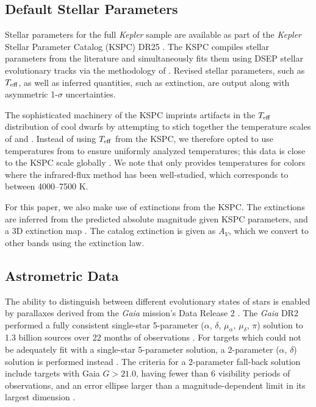 \documentclass[manuscript]{aastex6}
\newcommand{\Kepler}{\mbox{\textit{Kepler}}}
\newcommand{\Gaia}{\mbox{\textit{Gaia}}}
\newcommand{\Teff}{\ensuremath{T_{\rm eff}}}
\begin{document}
\subsection{Default Stellar Parameters}

Stellar parameters for the full \Kepler{} sample are available as part of the
\Kepler{} Stellar Parameter Catalog (KSPC) DR25 \citep{Mathur17}. The KSPC
compiles stellar parameters from the literature and simultaneously fits them
using DSEP stellar evolutionary tracks \citep{Dotter08} via the methodology of
\citet{Huber14}. Revised stellar parameters, such as \Teff, as well as inferred
quantities, such as extinction, are output along with asymmetric
1-\(\sigma\) uncertainties. 

The sophisticated machinery of the KSPC imprints artifacts in the \Teff{}
distribution of cool dwarfs by attempting to stich together the temperature
scales of \citet{Pinsonneault12} and \citet{Dressing13}. Instead of using
\Teff{} from the KSPC, we therefore opted to use temperatures from 
\citet{Pinsonneault12} to ensure uniformly analyzed temperatures; this data is
close to the KSPC scale globally \citep{Huber17}. We note that 
\citet{Pinsonneault12} only provides temperatures for colors where the
infrared-flux method has been well-studied, which corresponds to between
4000--7500 K.

For this paper, we also make use of extinctions from the KSPC\@. The
extinctions are inferred from the predicted absolute magnitude given KSPC 
parameters, and a 3D extinction map \citep{Amores05}. The catalog extinction 
is given as \(A_V\), which we convert to other bands using the 
\citet{Cardelli89} extinction law. 

\subsection{Astrometric Data}

The ability to distinguish between different evolutionary states of stars is
enabled by parallaxes derived from the \Gaia{} mission's Data Release 2
\citep{Gaia18}. The \Gaia{} DR2 performed a fully consistent single-star
5-parameter (\(\alpha\), \(\delta\), \(\mu_\alpha\), \(\mu_\delta\), \(\pi\))
solution to 1.3 billion sources over 22 months of observations
\citep{Lindegren18}. For targets which could not be adequately fit with a
single-star 5-parameter solution, a 2-parameter (\(\alpha\), \(\delta\))
solution is performed instead \citep{Michalik15}. The criteria for a
2-parameter fall-back solution include targets with Gaia \(G > 21.0\), having
fewer than 6 visibility periods of observations, and an error ellipse larger
than a magnitude-dependent limit in its largest dimension \citep{Lindegren18}.
\end{document}
